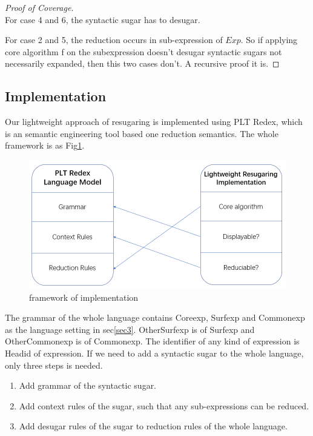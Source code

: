 \begin{proof}[Proof of Coverage]
\hfill\\
For case 4 and 6, the syntactic sugar has to desugar.

For case 2 and 5, the reduction occurs in sub-expression of $Exp$. So if applying core algorithm f on the subexpression doesn't desugar syntactic sugars not necessarily expanded, then this two cases don't. A recursive proof it is.
\end{proof}

\subsection{Implementation}

Our lightweight approach of resugaring is implemented using PLT Redex\cite{SEwPR}, which is an semantic engineering tool based one reduction semantics. The whole framework is as Fig\ref{fig:frame}.

\begin{figure}[h]
	\centering
	\includegraphics[width=12cm]{images/frame.png}
	\caption{framework of implementation}
	\label{fig:frame}
\end{figure}

The grammar of the whole language contains Coreexp, Surfexp and Commonexp as the language setting in sec\ref{sec3}. OtherSurfexp is of Surfexp and OtherCommonexp is of Commonexp. The identifier of any kind of expression is Headid of expression. If we need to add a syntactic sugar to the whole language, only three steps is needed.

\begin{enumerate}
\item Add grammar of the syntactic sugar.
\item Add context rules of the sugar, such that any sub-expressions can be reduced.
\item Add desugar rules of the sugar to reduction rules of the whole language.
\end{enumerate}

